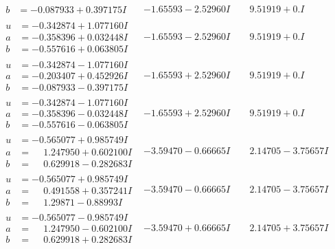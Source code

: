 \documentclass[1p]{elsarticle_modified}
\theoremstyle{definition}
\begin{document}
$$\begin{array}{c|c|c}
\begin{aligned}
b &= -0.087933 + 0.397175 I\end{aligned}
 & -1.65593 - 2.52960 I & \phantom{-}9.51919 + 0. I\phantom{ +0.000000I} \\ \hline\begin{aligned}
u &= -0.342874 + 1.077160 I \\
a &= -0.358396 + 0.032448 I \\
b &= -0.557616 + 0.063805 I\end{aligned}
 & -1.65593 - 2.52960 I & \phantom{-}9.51919 + 0. I\phantom{ +0.000000I} \\ \hline\begin{aligned}
u &= -0.342874 - 1.077160 I \\
a &= -0.203407 + 0.452926 I \\
b &= -0.087933 - 0.397175 I\end{aligned}
 & -1.65593 + 2.52960 I & \phantom{-}9.51919 + 0. I\phantom{ +0.000000I} \\ \hline\begin{aligned}
u &= -0.342874 - 1.077160 I \\
a &= -0.358396 - 0.032448 I \\
b &= -0.557616 - 0.063805 I\end{aligned}
 & -1.65593 + 2.52960 I & \phantom{-}9.51919 + 0. I\phantom{ +0.000000I} \\ \hline\begin{aligned}
u &= -0.565077 + 0.985749 I \\
a &= \phantom{-}1.247950 + 0.602100 I \\
b &= \phantom{-}0.629918 - 0.282683 I\end{aligned}
 & -3.59470 - 0.66665 I & \phantom{-}2.14705 - 3.75657 I \\ \hline\begin{aligned}
u &= -0.565077 + 0.985749 I \\
a &= \phantom{-}0.491558 + 0.357241 I \\
b &= \phantom{-}1.29871 - 0.88993 I\end{aligned}
 & -3.59470 - 0.66665 I & \phantom{-}2.14705 - 3.75657 I \\ \hline\begin{aligned}
u &= -0.565077 - 0.985749 I \\
a &= \phantom{-}1.247950 - 0.602100 I \\
b &= \phantom{-}0.629918 + 0.282683 I\end{aligned}
 & -3.59470 + 0.66665 I & \phantom{-}2.14705 + 3.75657 I \\ \hline\begin{aligned}

\end{aligned}
\end{array}$$
\end{document}

